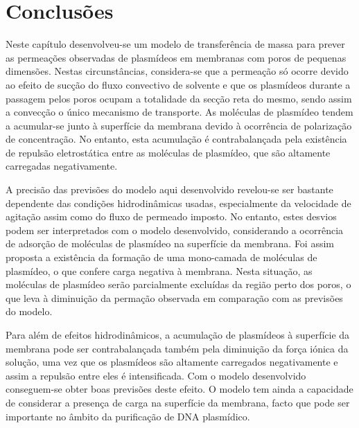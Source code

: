 \section{Conclusões}
Neste capítulo desenvolveu-se um modelo de transferência de massa para prever as permeações observadas de plasmídeos em membranas com poros de pequenas dimensões. Nestas circunstâncias, considera-se que a permeação só ocorre devido ao efeito de sucção do fluxo convectivo de solvente e que os plasmídeos durante a passagem pelos poros ocupam a totalidade da secção reta do mesmo, sendo assim a convecção o único mecanismo de transporte. As moléculas de plasmídeo tendem a acumular-se junto à superfície da membrana devido à ocorrência de polarização de concentração. No entanto, esta acumulação é contrabalançada pela existência de repulsão eletrostática entre as moléculas de plasmídeo, que são altamente carregadas negativamente.

A precisão das previsões do modelo aqui desenvolvido revelou-se ser bastante dependente das condições hidrodinâmicas usadas, especialmente da velocidade de agitação assim como do fluxo de permeado imposto. No entanto, estes desvios podem ser interpretados com o modelo desenvolvido, considerando a ocorrência de adsorção de moléculas de plasmídeo na superfície da membrana. Foi assim proposta a existência da formação de uma mono-camada de moléculas de plasmídeo, o que confere carga negativa à membrana. Nesta situação, as moléculas de plasmídeo serão parcialmente excluídas da região perto dos poros, o que leva à diminuição da permação observada em comparação com as previsões do modelo.

Para além de efeitos hidrodinâmicos, a acumulação de plasmídeos à superfície da membrana pode ser contrabalançada também pela diminuição da força iónica da solução, uma vez que os plasmídeos são altamente carregados negativamente e assim a repulsão entre eles é intensificada. Com o modelo desenvolvido conseguem-se obter boas previsões deste efeito. O modelo tem ainda a capacidade de considerar a presença de carga na superfície da membrana, facto que pode ser importante no âmbito da purificação de DNA plasmídico.     

